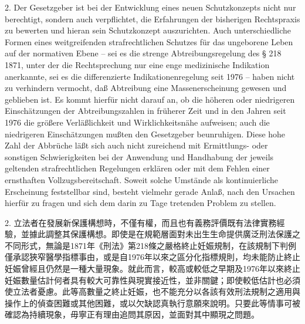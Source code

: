 \documentclass[12pt]{article}
\begin{document}
\begin{sourcepara}[title={原文D.73}]
2. Der Gesetzgeber ist bei der Entwicklung eines neuen Schutzkonzepts nicht nur berechtigt, sondern auch verpflichtet, die Erfahrungen der bisherigen Rechtspraxis zu bewerten und hieran sein Schutzkonzept auszurichten. Auch unterschiedliche Formen eines weitgreifenden strafrechtlichen Schutzes für das ungeborene Leben auf der normativen Ebene -- sei es die strenge Abtreibungsregelung des § 218 \abbrStGB{} 1871, unter der die Rechtsprechung nur eine enge medizinische Indikation anerkannte, sei es die differenzierte Indikationenregelung seit 1976 -- haben nicht zu verhindern vermocht, daß Abtreibung eine Massenerscheinung gewesen und geblieben ist. Es kommt hierfür nicht darauf an, ob die höheren oder niedrigeren Einschätzungen der Abtreibungszahlen in früherer Zeit und in den Jahren seit 1976 die größere Verläßlichkeit und Wirklichkeitsnähe aufweisen; auch die niedrigeren Einschätzungen mußten den Gesetzgeber beunruhigen. Diese hohe Zahl der Abbrüche läßt sich auch nicht zureichend mit Ermittlungs- oder sonstigen Schwierigkeiten bei der Anwendung und Handhabung der jeweils geltenden strafrechtlichen Regelungen erklären oder mit dem Fehlen einer ernsthaften Vollzugsbereitschaft. Soweit solche Umstände als kontinuierliche Erscheinung feststellbar sind, besteht vielmehr gerade Anlaß, nach den Ursachen hierfür zu fragen und sich dem darin zu Tage tretenden Problem zu stellen.
\end{sourcepara}
\begin{transpara}
2. 立法者在發展新保護構想時，不僅有權，而且也有義務評價既有法律實務經驗，並據此調整其保護構想。即使是在規範層面對未出生生命提供廣泛刑法保護之不同形式，無論是1871年《刑法》第218條之嚴格終止妊娠規制，在該規制下判例僅承認狹窄醫學指標事由，或是自1976年以來之區分化指標規則，均未能防止終止妊娠曾經且仍然是一種大量現象。就此而言，較高或較低之早期及1976年以來終止妊娠數量估計何者具有較大可靠性與現實接近性，並非關鍵；即使較低估計也必須使立法者憂慮。此等高數量之終止妊娠，也不能充分以各該有效刑法規制之適用與操作上的偵查困難或其他困難，或以欠缺認真執行意願來說明。只要此等情事可被確認為持續現象，毋寧正有理由追問其原因，並面對其中顯現之問題。
\end{transpara}
\end{document}
